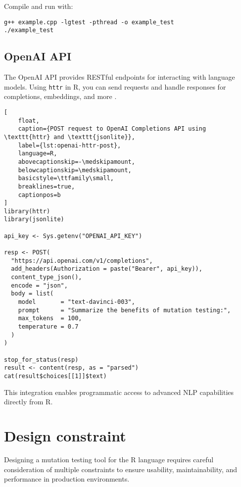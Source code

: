 Compile and run with:
\begin{verbatim}
g++ example.cpp -lgtest -pthread -o example_test
./example_test
\end{verbatim}

\subsection{OpenAI API}

The OpenAI API provides RESTful endpoints for interacting with language models. Using \texttt{httr} in R, you can send requests and handle responses for completions, embeddings, and more \cite{openai2023api}.

\begin{lstlisting}[
    float,
    caption={POST request to OpenAI Completions API using \texttt{httr} and \texttt{jsonlite}},
    label={lst:openai-httr-post},
    language=R,
    abovecaptionskip=-\medskipamount,
    belowcaptionskip=\medskipamount,
    basicstyle=\ttfamily\small,
    breaklines=true,
    captionpos=b
]
library(httr)
library(jsonlite)

api_key <- Sys.getenv("OPENAI_API_KEY")

resp <- POST(
  "https://api.openai.com/v1/completions",
  add_headers(Authorization = paste("Bearer", api_key)),
  content_type_json(),
  encode = "json",
  body = list(
    model       = "text-davinci-003",
    prompt      = "Summarize the benefits of mutation testing:",
    max_tokens  = 100,
    temperature = 0.7
  )
)

stop_for_status(resp)
result <- content(resp, as = "parsed")
cat(result$choices[[1]]$text)
\end{lstlisting}


This integration enables programmatic access to advanced NLP capabilities directly from R.

\section{Design constraint}

Designing a mutation testing tool for the R language requires careful consideration of multiple constraints to ensure usability, maintainability, and performance in production environments.

